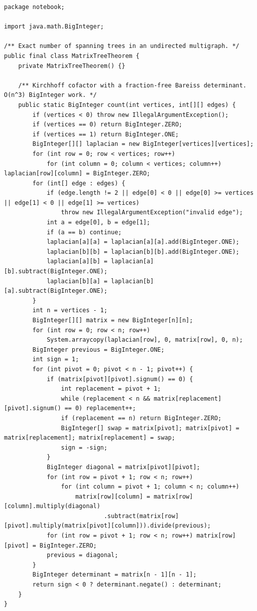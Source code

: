 \documentclass[10pt,letterpaper]{article}
\begin{document}
\begin{lstlisting}
package notebook;

import java.math.BigInteger;

/** Exact number of spanning trees in an undirected multigraph. */
public final class MatrixTreeTheorem {
    private MatrixTreeTheorem() {}

    /** Kirchhoff cofactor with a fraction-free Bareiss determinant. O(n^3) BigInteger work. */
    public static BigInteger count(int vertices, int[][] edges) {
        if (vertices < 0) throw new IllegalArgumentException();
        if (vertices == 0) return BigInteger.ZERO;
        if (vertices == 1) return BigInteger.ONE;
        BigInteger[][] laplacian = new BigInteger[vertices][vertices];
        for (int row = 0; row < vertices; row++)
            for (int column = 0; column < vertices; column++) laplacian[row][column] = BigInteger.ZERO;
        for (int[] edge : edges) {
            if (edge.length != 2 || edge[0] < 0 || edge[0] >= vertices || edge[1] < 0 || edge[1] >= vertices)
                throw new IllegalArgumentException("invalid edge");
            int a = edge[0], b = edge[1];
            if (a == b) continue;
            laplacian[a][a] = laplacian[a][a].add(BigInteger.ONE);
            laplacian[b][b] = laplacian[b][b].add(BigInteger.ONE);
            laplacian[a][b] = laplacian[a][b].subtract(BigInteger.ONE);
            laplacian[b][a] = laplacian[b][a].subtract(BigInteger.ONE);
        }
        int n = vertices - 1;
        BigInteger[][] matrix = new BigInteger[n][n];
        for (int row = 0; row < n; row++)
            System.arraycopy(laplacian[row], 0, matrix[row], 0, n);
        BigInteger previous = BigInteger.ONE;
        int sign = 1;
        for (int pivot = 0; pivot < n - 1; pivot++) {
            if (matrix[pivot][pivot].signum() == 0) {
                int replacement = pivot + 1;
                while (replacement < n && matrix[replacement][pivot].signum() == 0) replacement++;
                if (replacement == n) return BigInteger.ZERO;
                BigInteger[] swap = matrix[pivot]; matrix[pivot] = matrix[replacement]; matrix[replacement] = swap;
                sign = -sign;
            }
            BigInteger diagonal = matrix[pivot][pivot];
            for (int row = pivot + 1; row < n; row++)
                for (int column = pivot + 1; column < n; column++)
                    matrix[row][column] = matrix[row][column].multiply(diagonal)
                            .subtract(matrix[row][pivot].multiply(matrix[pivot][column])).divide(previous);
            for (int row = pivot + 1; row < n; row++) matrix[row][pivot] = BigInteger.ZERO;
            previous = diagonal;
        }
        BigInteger determinant = matrix[n - 1][n - 1];
        return sign < 0 ? determinant.negate() : determinant;
    }
}
\end{lstlisting}
\end{document}
